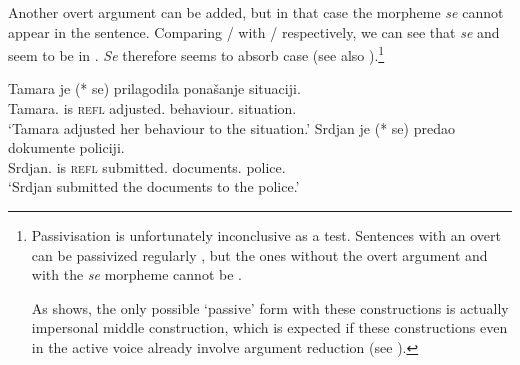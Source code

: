 \documentclass[output=paper,modfonts,newtxmath,hidelinks]{langscibook}
\begin{document}
\noindent Another overt \accc{} argument can be added, but in that case the morpheme \textit{se} cannot appear in the sentence. Comparing / with / respectively, we can see that \textit{se} and \accc{} seem to be in . \textit{Se} therefore seems to absorb \accc{} case (see also \citealt{franks95}).\footnote{Passivisation is unfortunately inconclusive as a test. Sentences with an overt  can be passivized regularly , but the ones without the overt \accc{} argument and with the \textit{se} morpheme cannot be .  
	
	\ea
	\label{16:fn7exia}
	\label{16:fn7exib}
	\label{16:fn7exic}
    \z \z

\noindent	As  shows, the only possible `passive' form with these constructions is actually impersonal middle construction, which is expected if these constructions even in the active voice already involve argument reduction (see \citealt{progovac13,marelj04}).}

\ea\label{16:structuraladjust}
\ea\label{16:ex30a}\gll Tamara je (*\hspace{-2pt} se) prilagodila ponašanje situaciji.\\
Tamara.\nomm{} is {} \textsc{refl} adjusted.\fsg{} behaviour.\accc{} situation.\datt\\
\glt `Tamara adjusted her behaviour to the situation.'
\ex\label{16:ex30b}\gll Srdjan je (*\hspace{-2pt} se) predao dokumente policiji.\\
Srdjan.\nomm{} is {} \textsc{refl} submitted.\msg{} documents.\accc{} police.\datt\\
\glt `Srdjan submitted the documents to the police.'
\z \z
\end{document}
